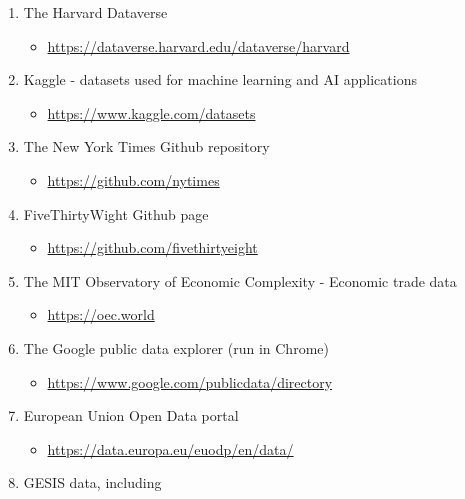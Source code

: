 \documentclass[
]{book}
\providecommand{\tightlist}{%
  \setlength{\itemsep}{0pt}\setlength{\parskip}{0pt}}
\begin{document}
\begin{enumerate}
\def\labelenumi{\arabic{enumi}.}
\tightlist
\item
  The Harvard Dataverse

  \begin{itemize}
  \tightlist
  \item
    \url{https://dataverse.harvard.edu/dataverse/harvard}
  \end{itemize}
\item
  Kaggle - datasets used for machine learning and AI applications

  \begin{itemize}
  \tightlist
  \item
    \url{https://www.kaggle.com/datasets}
  \end{itemize}
\item
  The New York Times Github repository

  \begin{itemize}
  \tightlist
  \item
    \url{https://github.com/nytimes}
  \end{itemize}
\item
  FiveThirtyWight Github page

  \begin{itemize}
  \tightlist
  \item
    \url{https://github.com/fivethirtyeight}
  \end{itemize}
\item
  The MIT Observatory of Economic Complexity - Economic trade data

  \begin{itemize}
  \tightlist
  \item
    \url{https://oec.world}
  \end{itemize}
\item
  The Google public data explorer (run in Chrome)

  \begin{itemize}
  \tightlist
  \item
    \url{https://www.google.com/publicdata/directory}
  \end{itemize}
\item
  European Union Open Data portal

  \begin{itemize}
  \tightlist
  \item
    \url{https://data.europa.eu/euodp/en/data/}
  \end{itemize}
\item
  GESIS data, including


\end{enumerate}
\end{document}
